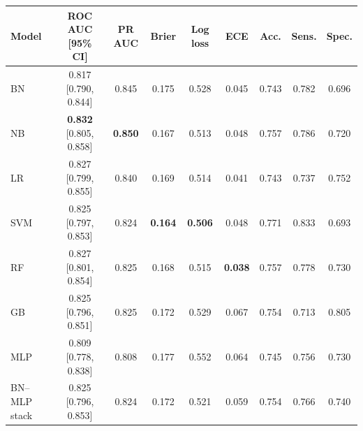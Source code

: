 \begin{tabular}{lcccccccc}
\toprule
Model & ROC AUC [95\% CI] & PR AUC & Brier & Log loss & ECE & Acc. & Sens. & Spec. \\
\midrule
BN & 0.817 [0.790, 0.844] & 0.845 & 0.175 & 0.528 & 0.045 & 0.743 & 0.782 & 0.696 \\
NB & \textbf{0.832} [0.805, 0.858] & \textbf{0.850} & 0.167 & 0.513 & 0.048 & 0.757 & 0.786 & 0.720 \\
LR & 0.827 [0.799, 0.855] & 0.840 & 0.169 & 0.514 & 0.041 & 0.743 & 0.737 & 0.752 \\
SVM & 0.825 [0.797, 0.853] & 0.824 & \textbf{0.164} & \textbf{0.506} & 0.048 & 0.771 & 0.833 & 0.693 \\
RF & 0.827 [0.801, 0.854] & 0.825 & 0.168 & 0.515 & \textbf{0.038} & 0.757 & 0.778 & 0.730 \\
GB & 0.825 [0.796, 0.851] & 0.825 & 0.172 & 0.529 & 0.067 & 0.754 & 0.713 & 0.805 \\
\midrule
MLP & 0.809 [0.778, 0.838] & 0.808 & 0.177 & 0.552 & 0.064 & 0.745 & 0.756 & 0.730 \\
BN--MLP stack & 0.825 [0.796, 0.853] & 0.824 & 0.172 & 0.521 & 0.059 & 0.754 & 0.766 & 0.740 \\
\bottomrule
\end{tabular}
